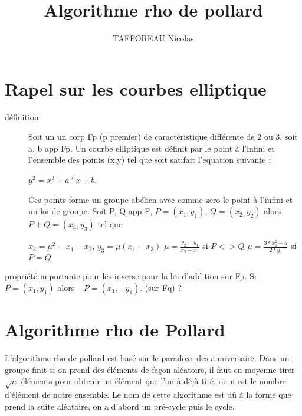 \documentclass[a4paper,10pt]{report}
\title{Algorithme rho de pollard}
\author{TAFFOREAU Nicolas}
\begin{document}
\maketitle
\tableofcontents

\chapter{Rapel sur les courbes elliptique}
\begin{description}
  \item[définition]

    Soit un un corp Fp (p premier) de caractéristique différente de 2 ou 3, soit a, b app Fp. Un courbe elliptique est définit par
    le point à l'infini et l'ensemble des points (x,y) tel que soit satifait l'equation suivante :
  \begin{center}
    $y^2 = x^3 + a*x + b$.   
  \end{center}
  Ces points forme un groupe abélien avec comme zero le point à l'infini et un loi de groupe.
  Soit P, Q app F, $ P = (x_1,y_1)$, $Q = (x_2,y_2)$ alors $P+Q = (x_3,y_3)$ tel que 
    \begin{center}
      $x_3 = \mu^2 -x_1 - x_2$, $y_3 = \mu(x_1-x_3)$
      \newline
      $\mu = \frac{y_2 - y_1}{x_2 - x_1}$ si $P <> Q$
      \newline
      $\mu = \frac{3*x_1^2 + a}{2*y_1}$ si $P = Q$
    \end{center}

\end{description}

propriété importante pour les inverse pour la loi d'addition sur Fp. Si $P = (x_1,y_1)$ alors $-P = (x_1,-y_1)$.
(sur Fq) ?
\chapter{Algorithme rho de Pollard}
L'algorithme rho de pollard est basé sur le paradoxe des anniversaire. Dans un groupe finit si on prend des éléments de façon aléatoire,
il faut en moyenne tirer $\sqrt{n}$ éléments pour obtenir un élément que l'on à déjà tiré, ou n est le nombre d'élément de notre ensemble.
Le nom de cette algorithme est dû à la forme que prend la suite aléatoire, on a d'abord un pré-cycle puis le cycle.
\end{document}
